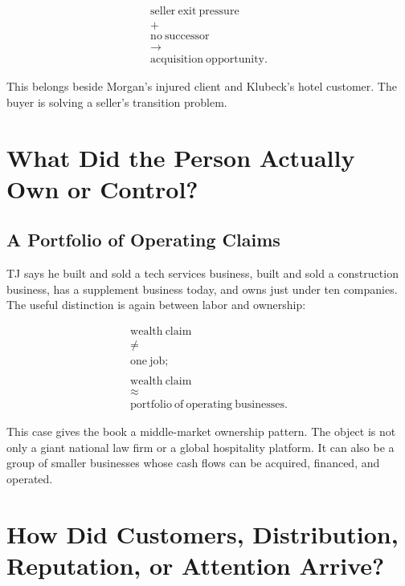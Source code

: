 \documentclass[11pt,oneside]{book}
\begin{document}
\begin{equation}
\begin{gathered}
\mathrm{seller\ exit\ pressure}\\
+\\
\mathrm{no\ successor}\\
\longrightarrow\\
\mathrm{acquisition\ opportunity}.
\end{gathered}
\end{equation}

This belongs beside Morgan's injured client and Klubeck's hotel customer. The buyer is solving a seller's transition problem.

\chapter{What Did the Person Actually Own or Control?}

\section{A Portfolio of Operating Claims}

TJ says he built and sold a tech services business, built and sold a construction business, has a supplement business today, and owns just under ten companies. The useful distinction is again between labor and ownership:

\begin{equation}
\begin{gathered}
\mathrm{wealth\ claim}\\
\neq\\
\mathrm{one\ job};\\
\qquad\\
\mathrm{wealth\ claim}\\
\approx\\
\mathrm{portfolio\ of\ operating\ businesses}.
\end{gathered}
\end{equation}

This case gives the book a middle-market ownership pattern. The object is not only a giant national law firm or a global hospitality platform. It can also be a group of smaller businesses whose cash flows can be acquired, financed, and operated.

\chapter{How Did Customers, Distribution, Reputation, or Attention Arrive?}
\end{document}
